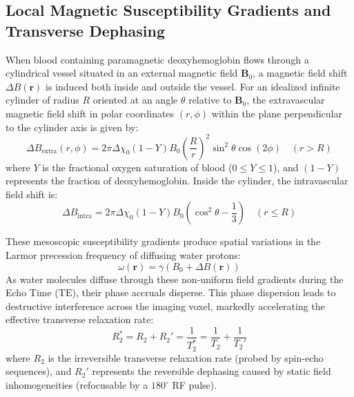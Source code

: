 \documentclass[11pt,a4paper]{article}
\begin{document}
\subsection{Local Magnetic Susceptibility Gradients and Transverse Dephasing}
When blood containing paramagnetic deoxyhemoglobin flows through a cylindrical vessel situated in an external magnetic field $\mathbf{B}_0$, a magnetic field shift $\Delta B(\mathbf{r})$ is induced both inside and outside the vessel. For an idealized infinite cylinder of radius $R$ oriented at an angle $\theta$ relative to $\mathbf{B}_0$, the extravascular magnetic field shift in polar coordinates $(r, \phi)$ within the plane perpendicular to the cylinder axis is given by:
\begin{equation}
    \Delta B_{\text{extra}}(r, \phi) = 2\pi \Delta \chi_0 (1 - Y) B_0 \left(\frac{R}{r}\right)^2 \sin^2\theta \cos(2\phi) \quad (r > R)
\end{equation}
where $Y$ is the fractional oxygen saturation of blood ($0 \le Y \le 1$), and $(1 - Y)$ represents the fraction of deoxyhemoglobin. Inside the cylinder, the intravascular field shift is:
\begin{equation}
    \Delta B_{\text{intra}} = 2\pi \Delta \chi_0 (1 - Y) B_0 \left( \cos^2\theta - \frac{1}{3} \right) \quad (r \le R)
\end{equation}

These mesoscopic susceptibility gradients produce spatial variations in the Larmor precession frequency of diffusing water protons:
\begin{equation}
    \omega(\mathbf{r}) = \gamma \left( B_0 + \Delta B(\mathbf{r}) \right)
\end{equation}
As water molecules diffuse through these non-uniform field gradients during the Echo Time ($\text{TE}$), their phase accruals disperse. This phase dispersion leads to destructive interference across the imaging voxel, markedly accelerating the effective transverse relaxation rate:
\begin{equation}
    R_2^* = R_2 + R_2' = \frac{1}{T_2^*} = \frac{1}{T_2} + \frac{1}{T_2'}
\end{equation}
where $R_2$ is the irreversible transverse relaxation rate (probed by spin-echo sequences), and $R_2'$ represents the reversible dephasing caused by static field inhomogeneities (refocusable by a $180^\circ$ RF pulse).
\end{document}
